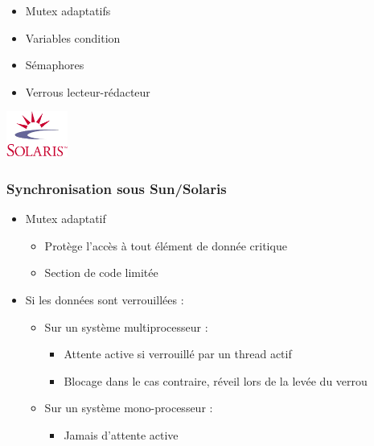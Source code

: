 \begin{frame}
\frametitle{}
\begin{itemize}
\item Mutex adaptatifs
\item Variables condition
\item Sémaphores
\item Verrous lecteur-rédacteur
\end{itemize}
\begin{flushright}
\includegraphics[width=2cm]{../illustration/Logo_Solaris.png}
\end{flushright}
\end{frame}

\begin{frame}
\frametitle{Synchronisation sous Sun/Solaris}
\begin{itemize}
\item <1-> Mutex adaptatif
\begin{itemize}
\item Protège l’accès à tout élément de donnée critique
\item Section de code limitée
\end{itemize}
\item <2-> Si les données sont verrouillées :
\begin{itemize}
\item <2-> Sur un système multiprocesseur :
\begin{itemize}
\item Attente active si verrouillé par un thread actif
\item Blocage dans le cas contraire, réveil lors de la levée du verrou
\end{itemize}
\item <3-> Sur un système mono-processeur :
\begin{itemize}
\item Jamais d’attente active
\end{itemize}
\end{itemize}
\end{itemize}
\end{frame}

